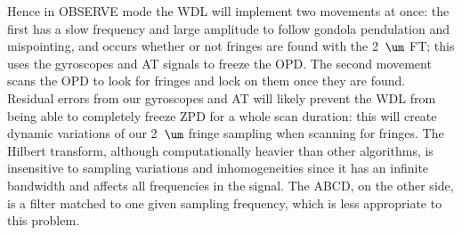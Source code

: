 Hence in OBSERVE mode the WDL will implement two movements at once: the first has a slow frequency and large amplitude to follow gondola pendulation and mispointing, and occurs whether or not fringes are found with the 2~$\um$ FT; this uses the gyroscopes and AT signals to freeze the OPD. The second movement scans the OPD to look for fringes and lock on them once they are found. Residual errors from our gyroscopes and AT will likely prevent the WDL from being able to completely freeze ZPD for a whole scan duration: this will create dynamic variations of our 2~$\um$ fringe sampling when scanning for fringes.
The Hilbert transform, although computationally heavier than other algorithms, is insensitive to sampling variations and inhomogeneities since it has an infinite bandwidth and affects all frequencies in the signal. The ABCD, on the other side, is a filter matched to one given sampling frequency, which is less appropriate to this problem.







